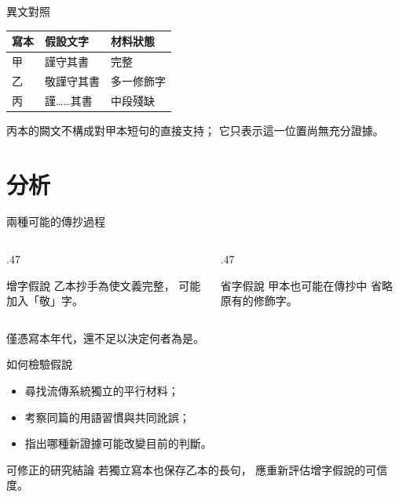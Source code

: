 \documentclass[lang=zh]{impebeamer}
\begin{document}
\begin{frame}{異文對照}
  \begin{table}
    \centering
    \begin{tabular}{lll}
      \toprule
      寫本 & 假設文字 & 材料狀態 \\
      \midrule
      甲 & 謹守其書 & 完整 \\
      乙 & 敬謹守其書 & 多一修飾字 \\
      丙 & 謹……其書 & 中段殘缺 \\
      \bottomrule
    \end{tabular}
  \end{table}
  \medskip
  丙本的闕文不構成對甲本短句的直接支持；
  它只表示這一位置尚無充分證據。
\end{frame}

\section{分析}
\begin{frame}{兩種可能的傳抄過程}
  \begin{columns}[T]
    \begin{column}{.47\textwidth}
      \begin{block}{增字假說}
        乙本抄手為使文義完整，
        可能加入「敬」字。
      \end{block}
    \end{column}
    \begin{column}{.47\textwidth}
      \begin{block}{省字假說}
        甲本也可能在傳抄中
        省略原有的修飾字。
      \end{block}
    \end{column}
  \end{columns}
  \medskip
  僅憑寫本年代，還不足以決定何者為是。
\end{frame}

\begin{frame}{如何檢驗假說}
  \begin{itemize}
    \item 尋找流傳系統獨立的平行材料；
    \item 考察同篇的用語習慣與共同訛誤；
    \item 指出哪種新證據可能改變目前的判斷。
  \end{itemize}
  \begin{exampleblock}{可修正的研究結論}
    若獨立寫本也保存乙本的長句，
    應重新評估增字假說的可信度。
  \end{exampleblock}
\end{frame}
\end{document}
